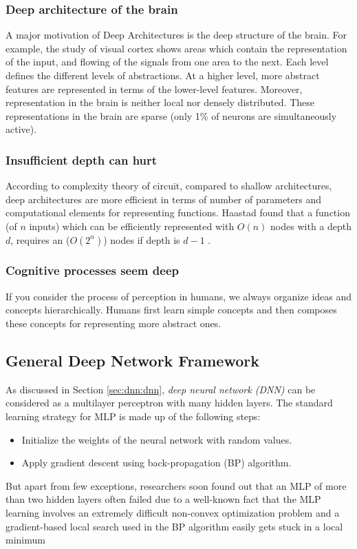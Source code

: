 \subsubsection{Deep architecture of the brain}
A major motivation of Deep Architectures is the deep structure of the brain.  For example, the study of visual cortex shows areas which contain the representation of the input, and flowing of the signals from one area to the next.  Each level defines the different levels of abstractions.  At a higher level, more abstract features are represented in terms of the lower-level features.  Moreover, representation in the brain is neither local nor densely distributed.  These representations in the brain are sparse (only 1\% of neurons are simultaneously active).

\subsubsection{Insufficient depth can hurt}
According to complexity theory of circuit, compared to shallow architectures, deep architectures are more efficient in terms of number of parameters and computational elements for representing functions\citep{bengio2007scaling}.  Haastad found that a function (of $n$ inputs) which can be efficiently represented with $O(n)$ nodes with a depth $d$, requires an ($O(2^n)$) nodes if depth is $d-1$ \citep{bengio2007greedy}.

\subsubsection{Cognitive processes seem deep}
If you consider the process of perception in humans, we always organize ideas and concepts hierarchically.  Humans first learn simple concepts and then composes these concepts for representing more abstract ones. 

\subsection{General Deep Network Framework}
As discussed in Section \ref{sec:dnn:dnn}, \textit{deep neural network (DNN)} can be considered as a multilayer perceptron with many hidden layers.  The standard learning strategy for MLP is made up of the following steps:\\
\begin{itemize}
\item Initialize the weights of the neural network with random values.
\item Apply gradient descent using back-propagation (BP) algorithm.
\end{itemize}
But apart from few exceptions, researchers soon found out that an MLP of more than two hidden layers often failed \cite{bengio2007greedy} due to a well-known fact that the MLP learning involves an extremely difficult non-convex optimization problem and a gradient-based local search used in
the BP algorithm easily gets stuck in a local minimum 

